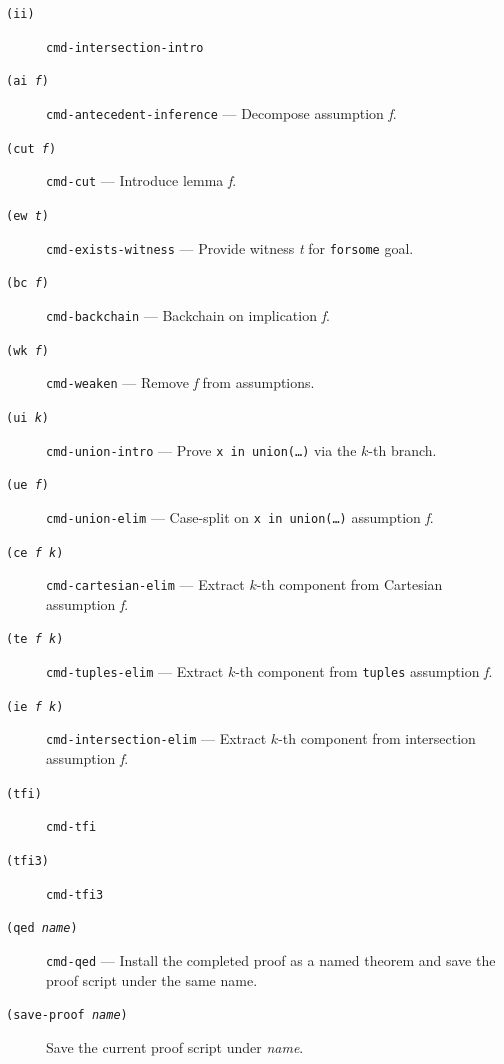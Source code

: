 \documentclass{amsbook}[openany]
\theoremstyle{definition}
\theoremstyle{remark}
\theoremstyle{remark}
\begin{document}
\begin{description}
\item[\texttt{(ii)}] \texttt{cmd-intersection-intro}

\item[\texttt{(ai \textit{f})}]
  \texttt{cmd-antecedent-inference} --- Decompose assumption \textit{f}.

\item[\texttt{(cut \textit{f})}]
  \texttt{cmd-cut} --- Introduce lemma \textit{f}.

\item[\texttt{(ew \textit{t})}]
  \texttt{cmd-exists-witness} --- Provide witness \textit{t} for
  \texttt{forsome} goal.

\item[\texttt{(bc \textit{f})}]
  \texttt{cmd-backchain} --- Backchain on implication \textit{f}.

\item[\texttt{(wk \textit{f})}]
  \texttt{cmd-weaken} --- Remove \textit{f} from assumptions.

\item[\texttt{(ui \textit{k})}]
  \texttt{cmd-union-intro} --- Prove \texttt{x in union(\ldots)} via the
  $k$-th branch.

\item[\texttt{(ue \textit{f})}]
  \texttt{cmd-union-elim} --- Case-split on \texttt{x in union(\ldots)}
  assumption \textit{f}.

\item[\texttt{(ce \textit{f k})}]
  \texttt{cmd-cartesian-elim} --- Extract $k$-th component from Cartesian
  assumption \textit{f}.

\item[\texttt{(te \textit{f k})}]
  \texttt{cmd-tuples-elim} --- Extract $k$-th component from
  \texttt{tuples} assumption \textit{f}.

\item[\texttt{(ie \textit{f k})}]
  \texttt{cmd-intersection-elim} --- Extract $k$-th component from
  intersection assumption \textit{f}.

\item[\texttt{(tfi)}] \texttt{cmd-tfi}

\item[\texttt{(tfi3)}] \texttt{cmd-tfi3}

\item[\texttt{(qed \textit{name})}]
  \texttt{cmd-qed} --- Install the completed proof as a named theorem and
  save the proof script under the same name.

\item[\texttt{(save-proof \textit{name})}]
  Save the current proof script under \textit{name}.


\end{description}
\end{document}
